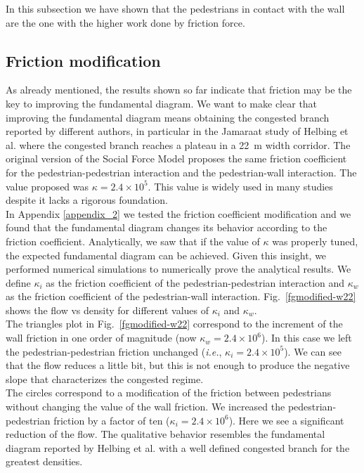 In this subsection we have shown that the pedestrians in contact with the wall are the one with the higher work done by friction force. 

\subsection{Friction modification}

As already mentioned, the results shown so far indicate that friction may be the key to improving the fundamental diagram. We want to make clear that improving the fundamental diagram means obtaining the congested branch reported by different authors, in particular in the Jamaraat study of Helbing et al. where the congested branch reaches a plateau in a 22~m width corridor. The original version of the Social Force Model proposes the same friction coefficient for the pedestrian-pedestrian interaction and the pedestrian-wall interaction. The value proposed was $\kappa = 2.4\times10^{5}$. This value is widely used in many studies despite it lacks a rigorous foundation. \\

In Appendix \ref{appendix_2} we tested the friction coefficient modification and we found that the fundamental diagram changes its behavior according to the friction coefficient. Analytically, we saw that if the value of $\kappa$ was properly tuned, the expected fundamental diagram can be achieved. Given this insight, we performed numerical simulations to numerically prove the analytical results. We define $\kappa_i$ as the friction coefficient of the pedestrian-pedestrian interaction and $\kappa_w$ as the friction coefficient of the pedestrian-wall interaction. Fig.~\ref{fgmodified-w22} shows the flow vs density for different values of $\kappa_i$ and $\kappa_w$.\\

The triangles plot in Fig.~\ref{fgmodified-w22} correspond to the increment of the wall friction in one order of magnitude (now $\kappa_w = 2.4\times10^{6}$). In this case we left the pedestrian-pedestrian friction unchanged (\textit{i.e.}, $\kappa_i = 2.4\times10^{5}$). We can see that the flow reduces a little bit, but this is not enough to produce the negative slope that characterizes the congested regime. \\

The circles correspond to a modification of the friction between pedestrians without changing the value of the wall friction. We increased the pedestrian-pedestrian friction by a factor of ten ($\kappa_i = 2.4\times10^{6}$). Here we see a significant reduction of the flow. The qualitative behavior resembles the fundamental diagram reported by Helbing et al. with a well defined congested branch for the greatest densities.\\

